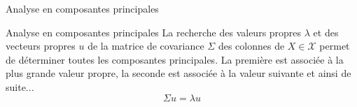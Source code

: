 \begin{frame}{Analyse en composantes principales}
	\begin{block}{Analyse en composantes principales}
		La recherche des valeurs propres $\lambda$ et des vecteurs propres $u$ de la matrice de covariance $\Sigma$ des colonnes de $X \in \mathcal{X}$ permet de déterminer toutes les composantes principales. La première est associée à la plus grande valeur propre, la seconde est associée à la valeur suivante et ainsi de suite...
		\begin{equation}
			\Sigma u = \lambda u
			\nonumber
		\end{equation}
	\end{block}
\end{frame}